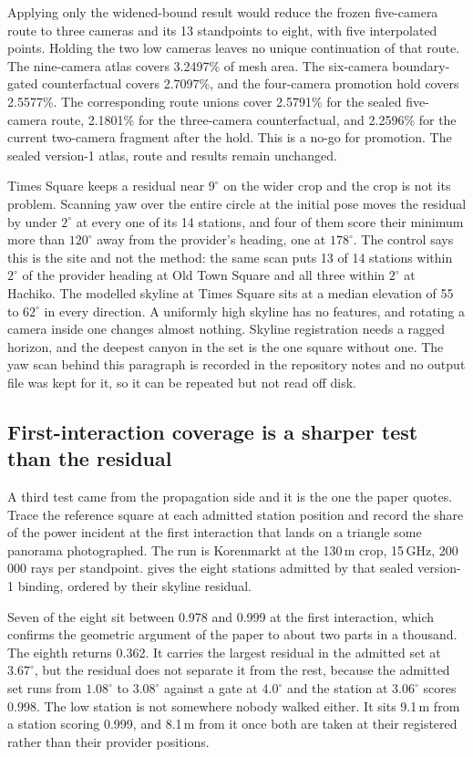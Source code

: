 \documentclass[journal]{IEEEtran}
\begin{document}
Applying only the widened-bound result would reduce the frozen five-camera
route to three cameras and its 13 standpoints to eight, with five interpolated
points. Holding the two low cameras leaves no unique continuation of that
route. The nine-camera atlas covers 3.2497\% of mesh area. The six-camera
boundary-gated counterfactual covers 2.7097\%, and the four-camera promotion
hold covers 2.5577\%. The corresponding route unions cover 2.5791\% for the
sealed five-camera route, 2.1801\% for the three-camera counterfactual, and
2.2596\% for the current two-camera fragment after the hold. This is a no-go
for promotion. The sealed version-1 atlas, route and results remain unchanged.

Times Square keeps a residual near $9^\circ$ on the wider crop and the crop is
not its problem. Scanning yaw over the entire circle at the initial pose moves
the residual by under $2^\circ$ at every one of its 14 stations, and four of
them score their minimum more than $120^\circ$ away from the provider's heading,
one at $178^\circ$. The control says this is the site and not the method: the
same scan puts 13 of 14 stations within $2^\circ$ of the provider heading at Old
Town Square and all three within $2^\circ$ at Hachiko. The modelled skyline at
Times Square sits at a median elevation of 55 to $62^\circ$ in every direction.
A uniformly high skyline has no features, and rotating a camera inside one
changes almost nothing. Skyline registration needs a ragged horizon, and the
deepest canyon in the set is the one square without one. The yaw scan behind
this paragraph is recorded in the repository notes and no output file was kept
for it, so it can be repeated but not read off disk.

\subsection{First-interaction coverage is a sharper test than the residual}
\label{sec:si-coverage-test}

A third test came from the propagation side and it is the one the paper quotes.
Trace the reference square at each admitted station position and record the
share of the power incident at the first interaction that lands on a triangle
some panorama photographed. The run is Korenmarkt at the 130\,m crop, 15\,GHz,
200\,000 rays per standpoint.  gives the eight
stations admitted by that sealed version-1 binding, ordered by their skyline
residual.

Seven of the eight sit between 0.978 and 0.999 at the first interaction, which
confirms the geometric argument of the paper to about two parts in a thousand.
The eighth returns 0.362. It carries the largest residual in the admitted set at
$3.67^\circ$, but the residual does not separate it from the rest, because the
admitted set runs from $1.08^\circ$ to $3.08^\circ$ against a gate at
$4.0^\circ$ and the station at $3.06^\circ$ scores 0.998. The low station is not
somewhere nobody walked either. It sits 9.1\,m from a station scoring 0.999, and
8.1\,m from it once both are taken at their registered rather than their
provider positions.
\end{document}
